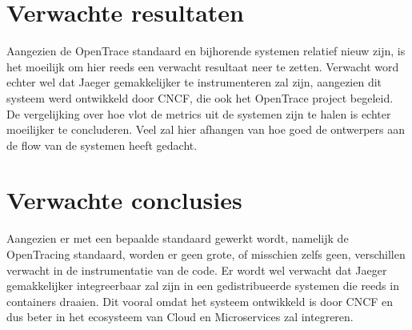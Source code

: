 \section{Verwachte resultaten}
\label{sec:verwachte_resultaten}

Aangezien de OpenTrace standaard en bijhorende systemen relatief nieuw zijn, is het moeilijk om hier reeds een verwacht resultaat neer te zetten. Verwacht word echter wel dat Jaeger gemakkelijker te instrumenteren zal zijn, aangezien dit systeem werd ontwikkeld door CNCF, die ook het OpenTrace project begeleid. De vergelijking over hoe vlot de metrics uit de systemen zijn te halen is echter moeilijker te concluderen. Veel zal hier afhangen van hoe goed de ontwerpers aan de flow van de systemen heeft gedacht.

\section{Verwachte conclusies}
\label{sec:verwachte_conclusies}

Aangezien er met een bepaalde standaard gewerkt wordt, namelijk de OpenTracing standaard, worden er geen grote, of misschien zelfs geen, verschillen verwacht in de instrumentatie van de code. Er wordt wel verwacht dat Jaeger gemakkelijker integreerbaar zal zijn in een gedistribueerde systemen die reeds in containers draaien. Dit vooral omdat het systeem ontwikkeld is door CNCF en dus beter in het ecosysteem van Cloud en Microservices zal integreren.

